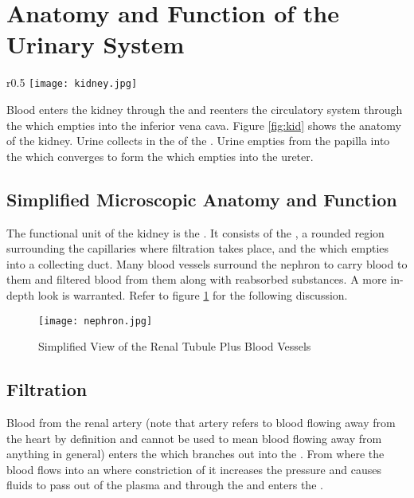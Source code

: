 \documentclass[../Bio_chemistryReview.tex]{subfiles}
\begin{document}
\section{Anatomy and Function of the Urinary System}
\begin{wrapfigure}{r}{0.5\textwidth}
  \centering
  \texttt{[image: kidney.jpg]}
  \caption{Internal Anatomy of the Kidney}
  \label{fig:kid}
  \vspace{-16pt}
\end{wrapfigure}
Blood enters the kidney through the  and reenters the
circulatory system through the  which empties into the
inferior vena cava. Figure \ref{fig:kid} shows the anatomy of the kidney. Urine
collects in the  of the .
Urine empties from the papilla into the  which converges to form
the  which empties into the ureter.

\subsection{Simplified Microscopic Anatomy and Function}
The functional unit of the kidney is the . It consists of the
, a rounded region surrounding the capillaries where filtration
takes place, and the  which empties into a collecting
duct. Many blood vessels surround the nephron to carry blood to them and
filtered blood from them along with reabsorbed substances. A more in-depth look
is warranted. Refer to figure \ref{fig:nep} for the following discussion.
\begin{figure}[H]
  \centering
  \texttt{[image: nephron.jpg]}
  \caption{Simplified View of the Renal Tubule Plus Blood Vessels}
  \label{fig:nep}
\end{figure}


\subsection{Filtration}
Blood from the renal artery (note that artery refers to blood flowing away from
the heart by definition and cannot be used to mean blood flowing away from
anything in general) enters the  which branches out
into the . From where the blood flows into an
 where constriction of it increases the pressure and
causes fluids to pass out of the plasma and through the  and enters the .
\end{document}
